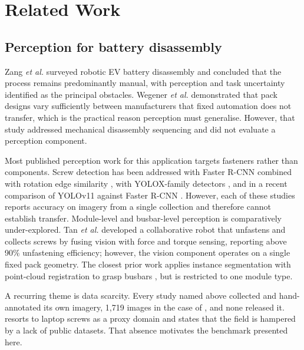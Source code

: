 \documentclass[conference]{IEEEtran}
\begin{document}
\section{Related Work}
\label{sec:related}

\subsection{Perception for battery disassembly}
Zang \emph{et al.} \cite{zang2024robotic} surveyed robotic EV battery disassembly
and concluded that the process remains predominantly manual, with perception and
task uncertainty identified as the principal obstacles. Wegener \emph{et al.}
\cite{wegener2015} demonstrated that pack designs vary sufficiently between
manufacturers that fixed automation does not transfer, which is the practical
reason perception must generalise. However, that study addressed mechanical
disassembly sequencing and did not evaluate a perception component.

Most published perception work for this application targets fasteners rather
than components. Screw detection has been addressed with Faster R-CNN combined
with rotation edge similarity \cite{screwrcnn2021}, with YOLOX-family detectors
\cite{screwbatt2023}, and in a recent comparison of YOLOv11 against Faster R-CNN
\cite{screwcompare2026}. However, each of these studies reports accuracy on
imagery from a single collection and therefore cannot establish transfer.
Module-level and busbar-level perception is comparatively under-explored. Tan
\emph{et al.} \cite{tan2025screws} developed a collaborative robot that unfastens
and collects screws by fusing vision with force and torque sensing, reporting
above 90\% unfastening efficiency; however, the vision component operates on a
single fixed pack geometry. The closest prior work applies instance segmentation
with point-cloud registration to grasp busbars \cite{cvmodule2023}, but is
restricted to one module type.

A recurring theme is data scarcity. Every study named above collected and
hand-annotated its own imagery, 1,719 images in the case of
\cite{screwbatt2023}, and none released it. \cite{screwcompare2026} resorts to
laptop screws as a proxy domain and states that the field is hampered by a lack
of public datasets. That absence motivates the benchmark presented here.
\end{document}
